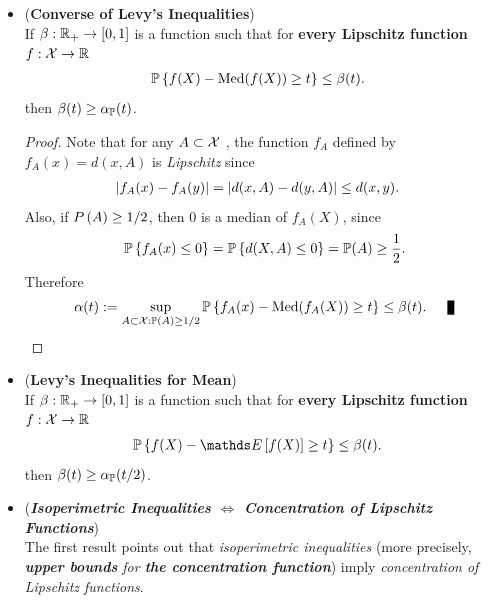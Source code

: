 \documentclass[11pt]{article}
\begin{document}
\begin{itemize}
\item \begin{theorem}  (\textbf{Converse of Levy's Inequalities})\citep{boucheron2013concentration, wainwright2019high}\\
If $\beta : {\mathbb R}_{+} \to [0, 1]$ is a function such that for \textbf{every Lipschitz function} $f : {\mathcal X} \to {\mathbb R}$
\begin{align}
{\mathbb P}\left\{f(X) - \text{Med}(f(X)) \ge t \right\} &\le \beta(t). \label{ineqn: converse_levy_inequality}
\end{align} then $\beta(t) \ge \alpha_{{\mathbb P}}(t)$.
\end{theorem}
\begin{proof}
Note that for any $A \subset {\mathcal X}$ , the function $f_A$ defined by $f_A(x)= d(x, A)$ is \emph{Lipschitz} since
\begin{align*}
\left\lvert f_A(x) - f_A(y) \right\rvert = \left\lvert d(x, A) - d(y, A) \right\rvert &\le d(x, y).
\end{align*} Also, if  $P\left(A\right) \ge 1/2$, then $0$ is a median of $f_A(X)$, since
\begin{align*}
{\mathbb P}\left\{f_A(x) \le 0\right\} = {\mathbb P}\left\{d(X, A) \le 0\right\} = {\mathbb P}(A) \ge \frac{1}{2}.
\end{align*}  Therefore
\begin{align*}
\alpha(t) := \sup_{A \subset \cX: \bP(A) \ge 1/2}\bP\set{f_A(x) - \text{Med}(f_A(X)) \ge t} \le \beta(t). \qed
\end{align*}
\end{proof}

\item \begin{proposition} (\textbf{Levy's Inequalities for Mean})\citep{boucheron2013concentration, wainwright2019high}\\
If $\beta: {\mathbb R}_{+} \to [0,1]$ is a  function such that for \textbf{every Lipschitz function} $f : {\mathcal X} \to {\mathbb R}$
\begin{align}
\bP\set{f(X) - \E{}{f(X)} \ge t } &\le \beta(t). \label{ineqn: converse_levy_inequality_mean}
\end{align} then $\beta(t) \ge \alpha_{{\mathbb P}}(t/2)$.
\end{proposition}

\item \begin{remark} (\emph{\textbf{Isoperimetric Inequalities $\Leftrightarrow$ Concentration of Lipschitz Functions}})\\
The first result points out that \emph{isoperimetric inequalities} (more precisely, \emph{\textbf{upper bounds} for \textbf{the concentration function}}) imply
\emph{concentration of Lipschitz functions}. 


\end{remark}
\end{itemize}
\end{document}
